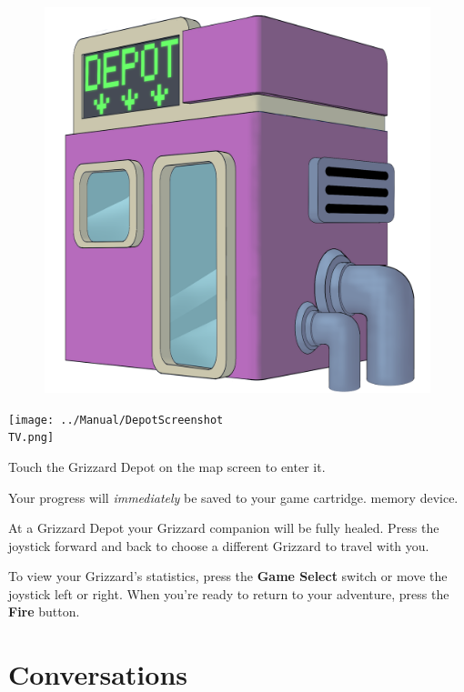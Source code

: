 \documentclass[10pt,twocolumn,openany,article]{memoir}
\newcommand\TV{NTSC}
\newcommand\TV{PAL}
\newcommand\TV{SECAM}
\begin{document}
\begin{figure}[hb]
  \begin{center}
    \includegraphics[width=2\columnwidth]{../Manual/GrizzardDepot.png}
  \end{center}
\end{figure}

\begin{center}
  \texttt{[image: ../Manual/DepotScreenshot\\TV.png]}
\end{center}

Touch the Grizzard Depot on the map screen to enter it.

\ifdefined\NOSAVE\else Your progress will \emph{immediately} be saved to
your \ifdefined\ATARIAGESAVE  game cartridge.  \else memory  device. \fi
\fi

At  a Grizzard  Depot  your  Grizzard companion  will  be fully  healed.
\ifdefined\NOSAVE\else  Press the  joystick forward  and back  to choose
a different Grizzard to travel with you. \fi

To  view  your Grizzard's  statistics,  press  the \textbf{Game  Select}
switch or move  the joystick left or right. When  you're ready to return
to your adventure, press the \textbf{Fire} button.

\section{Conversations}
\end{document}
